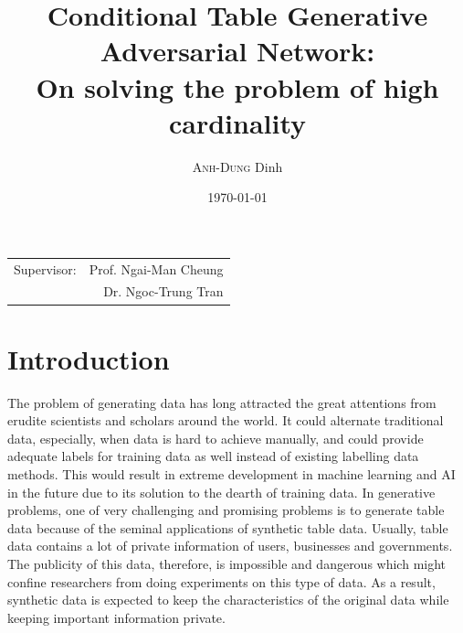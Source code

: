 \documentclass{article}
\title{Conditional Table Generative Adversarial Network:\\ On solving the problem of high cardinality} %
\author{\textsc{Anh-Dung} Dinh} %
\date{\today} %
\begin{document}
\maketitle %
\begin{center}
\begin{tabular}{l r}
Supervisor: & Prof. Ngai-Man Cheung \\%
& Dr. Ngoc-Trung Tran
\end{tabular}
\end{center}



\section{Introduction}

The problem of generating data has long attracted the great attentions from erudite scientists and scholars around the world. It could alternate traditional data, especially, when data is hard to achieve manually, and could provide adequate labels for training data as well instead of existing labelling data methods. This would result in extreme development in machine learning and \ac{AI} in the future due to its solution to the dearth of training data. In generative problems, one of very challenging and promising problems is to generate table data because of the seminal applications of synthetic table data. Usually, table data contains a lot of private information of users, businesses and governments. The publicity of this data, therefore, is impossible and dangerous which might confine researchers from doing experiments on this type of data. As a result, synthetic data is expected to keep the characteristics of the original data while keeping important information private. 
\end{document}
